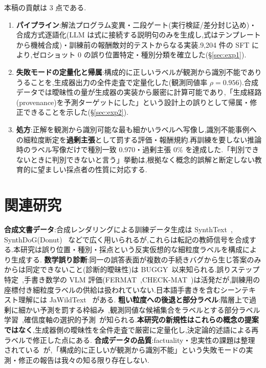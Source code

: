 \documentclass[a4paper,twocolumn,10pt]{jarticle}
\begin{document}
本稿の貢献は 3 点である.
\begin{enumerate}
\item \textbf{パイプライン}:解法プログラム変異・二段ゲート(実行検証/差分封じ込め)・合成方式逐語化(LLM は式に接続する説明句のみを生成し,式はテンプレートから機械合成)・訓練前の報酬敵対的テストからなる実装.9,204 件の SFT により,ゼロショット 0 の誤り位置特定・種別分類を確立した(\S\ref{sec:exp1}).
\item \textbf{失敗モードの定量化と帰属}:構成的に正しいラベルが観測から識別不能でありうることを,生成器出力の全件走査で定量化した(観測同値率 $\rho=0.956$).合成データでは曖昧性の量が生成器の実装から厳密に計算可能であり,「生成経路(provenance)を予測ターゲットにした」という設計上の誤りとして帰属・修正できることを示した(\S\ref{sec:exp2}).
\item \textbf{処方}:正解を観測から識別可能な最も細かいラベルへ写像し,識別不能事例への細粒度断定を\textbf{過剰主張}として罰する評価・報酬規約.再訓練を要しない推論時のラベル写像だけで種別一致 0.970・過剰主張 0\% を達成した.「判別できないときに判別できないと言う」挙動は,根拠なく概念的誤解と断定しない教育的に望ましい採点者の性質に対応する.
\end{enumerate}

\section{関連研究}
\textbf{合成文書データ}:合成レンダリングによる訓練データ生成は SynthText~\cite{gupta2016}, SynthDoG(Donut)~\cite{kim2022} などで広く用いられるが,これらは転記の教師信号を合成する.本研究は誤り位置・種別・採点という反実仮想的な細粒度ラベルを構成により生成する.
\textbf{数学誤り診断}:同一の誤答表面が複数の手続きバグから生じ答案のみからは同定できないこと(診断的曖昧性)は BUGGY~\cite{brown1978}以来知られる.誤りステップ特定~\cite{zheng2025,daheim2024},手書き数学の VLM 評価(FERMAT~\cite{nath2025},CHECK-MAT~\cite{khrulev2025})は活発だが,訓練用の座標付き細粒度ラベルの供給は扱われていない.日本語手書きを含むシーンテキスト理解には JaWildText~\cite{maeda2026} がある.
\textbf{粗い粒度への後退と部分ラベル}:階層上で過剰に細かい予測を罰する枠組み~\cite{deng2012},観測同値な候補集合をラベルとする部分ラベル学習~\cite{cour2011},確信度軸の選択的予測~\cite{chow1970,geifman2017}が知られる.\textbf{本研究の新規性はこれらの概念の提案ではなく},生成器側の曖昧性を全件走査で厳密に定量化し,決定論的述語による再ラベルで修正した点にある.
\textbf{合成データの品質}:factuality・忠実性の課題は整理されている~\cite{liu2024}が,「構成的に正しいが観測から識別不能」という失敗モードの実測・修正の報告は我々の知る限り存在しない.
\end{document}

